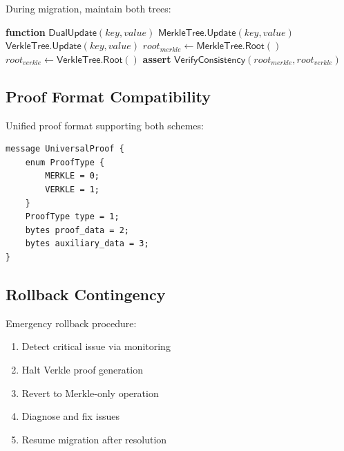 During migration, maintain both trees:
\begin{algorithmic}[1]
\STATE \textbf{function} $\mathsf{DualUpdate}(key, value)$
\STATE $\mathsf{MerkleTree.Update}(key, value)$
\STATE $\mathsf{VerkleTree.Update}(key, value)$
\STATE $root_{merkle} \gets \mathsf{MerkleTree.Root}()$
\STATE $root_{verkle} \gets \mathsf{VerkleTree.Root}()$
\STATE \textbf{assert} $\mathsf{VerifyConsistency}(root_{merkle}, root_{verkle})$
\end{algorithmic}

\subsection{Proof Format Compatibility}

Unified proof format supporting both schemes:
\begin{lstlisting}[caption=Universal Proof Format]
message UniversalProof {
    enum ProofType {
        MERKLE = 0;
        VERKLE = 1;
    }
    ProofType type = 1;
    bytes proof_data = 2;
    bytes auxiliary_data = 3;
}
\end{lstlisting}

\subsection{Rollback Contingency}

Emergency rollback procedure:
\begin{enumerate}
    \item Detect critical issue via monitoring
    \item Halt Verkle proof generation
    \item Revert to Merkle-only operation
    \item Diagnose and fix issues
    \item Resume migration after resolution
\end{enumerate}

